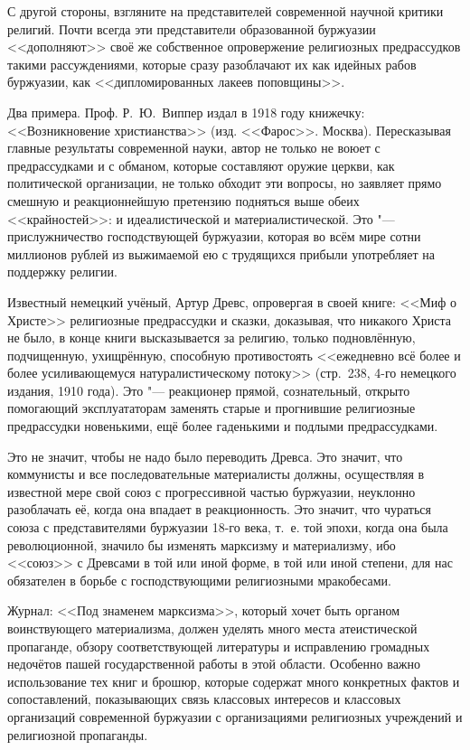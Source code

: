С другой стороны, взгляните на представителей современной научной критики
религий. Почти всегда эти представители образованной буржуазии <<дополняют>>
своё же собственное опровержение религиозных предрассудков такими
рассуждениями, которые сразу разоблачают их как идейных рабов буржуазии,
как <<дипломированных лакеев поповщины>>.

Два примера. Проф. Р.~Ю.~Виппер издал в
1918 году книжечку: <<Возникновение христианства>> (изд. <<Фарос>>. Москва).
Пересказывая главные результаты современной науки, автор не только не воюет
с предрассудками и с обманом, которые составляют оружие церкви, как
политической организации, не только обходит эти вопросы, но заявляет прямо
смешную и реакционнейшую претензию подняться выше обеих <<крайностей>>: и
идеалистической и материалистической. Это "--- прислужничество господствующей
буржуазии, которая во всём мире сотни миллионов рублей из выжимаемой ею с
трудящихся прибыли употребляет на поддержку религии.

Известный немецкий учёный, Артур Древс, опровергая в своей книге: <<Миф о
Христе>> религиозные предрассудки и сказки, доказывая, что никакого Христа
не было, в конце книги высказывается за религию, только подновлённую,
подчищенную, ухищрённую, способную противостоять <<ежедневно всё более и
более усиливающемуся натуралистическому потоку>> (стр.~238, 4-го немецкого
издания, 1910 года). Это "--- реакционер прямой, сознательный, открыто
помогающий эксплуататорам заменять старые и прогнившие религиозные
предрассудки новенькими, ещё более гаденькими и подлыми предрассудками.

Это не значит, чтобы не надо было переводить Древса. Это значит, что
коммунисты и все последовательные материалисты должны, осуществляя в
известной мере свой союз с прогрессивной частью буржуазии, неуклонно
разоблачать её, когда она впадает в реакционность. Это значит, что чураться
союза с представителями буржуазии 18-го века, т.~е. той эпохи, когда она
была революционной, значило бы изменять марксизму и материализму, ибо
<<союз>> с Древсами в той или иной форме, в той или иной степени, для нас
обязателен в борьбе с господствующими религиозными мракобесами.

Журнал: <<Под знаменем марксизма>>, который хочет быть органом воинствующего
материализма, должен уделять много места атеистической пропаганде, обзору
соответствующей литературы и исправлению громадных недочётов пашей
государственной работы в этой области. Особенно важно использование тех
книг и брошюр, которые содержат много конкретных фактов и сопоставлений,
показывающих связь классовых интересов и классовых организаций современной
буржуазии с организациями религиозных учреждений и религиозной пропаганды.

